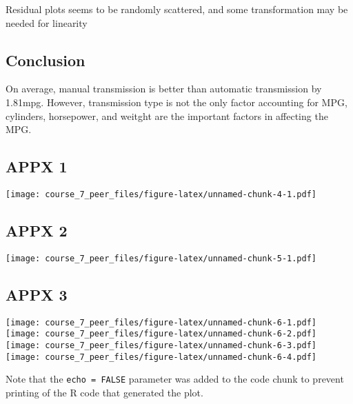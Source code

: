 \documentclass[]{article}
\begin{document}
Residual plots seems to be randomly scattered, and some transformation
may be needed for linearity

\subsection{Conclusion}\label{conclusion}

On average, manual transmission is better than automatic transmission by
1.81mpg. However, transmission type is not the only factor accounting
for MPG, cylinders, horsepower, and weitght are the important factors in
affecting the MPG.

\subsection{APPX 1}\label{appx-1}

\texttt{[image: course\_7\_peer\_files/figure-latex/unnamed-chunk-4-1.pdf]}

\subsection{APPX 2}\label{appx-2}

\texttt{[image: course\_7\_peer\_files/figure-latex/unnamed-chunk-5-1.pdf]}

\subsection{APPX 3}\label{appx-3}

\texttt{[image: course\_7\_peer\_files/figure-latex/unnamed-chunk-6-1.pdf]}
\texttt{[image: course\_7\_peer\_files/figure-latex/unnamed-chunk-6-2.pdf]}
\texttt{[image: course\_7\_peer\_files/figure-latex/unnamed-chunk-6-3.pdf]}
\texttt{[image: course\_7\_peer\_files/figure-latex/unnamed-chunk-6-4.pdf]}

Note that the \texttt{echo\ =\ FALSE} parameter was added to the code
chunk to prevent printing of the R code that generated the plot.
\end{document}
